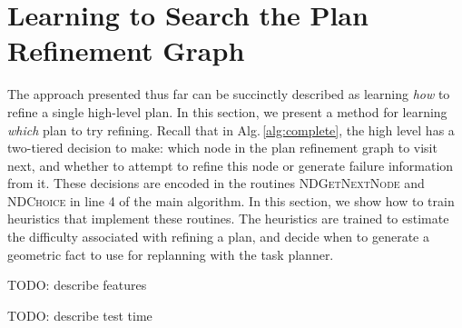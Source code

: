 \section{Learning to Search the Plan Refinement Graph}
The approach presented thus far can be succinctly described as learning \emph{how} to
refine a single high-level plan. In this section, we present a method for learning
\emph{which} plan to try refining. Recall that in Alg.\,\ref{alg:complete}, the high
level has a two-tiered decision to make: which node in the plan refinement graph to
visit next, and whether to attempt to refine this node or generate failure information
from it. These decisions are encoded in the routines \textsc{NDGetNextNode}
and \textsc{NDChoice} in line 4 of the main algorithm. In this section, we show how
to train heuristics that implement these routines. The heuristics are trained to estimate
the difficulty associated with refining a plan, and decide when to generate
a geometric fact to use for replanning with the task planner.

TODO: describe features

TODO: describe test time
